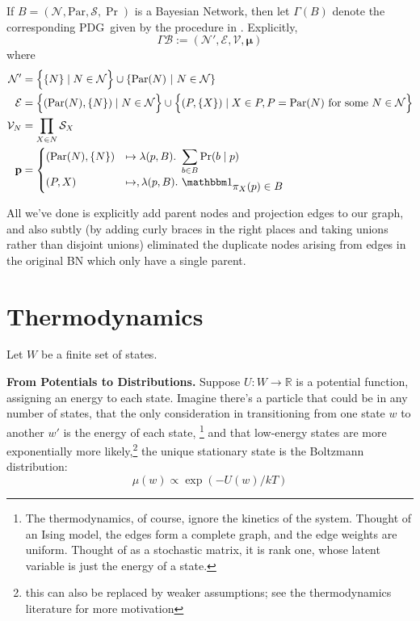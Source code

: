 \documentclass{article}
\newcommand{\bmu}{\boldsymbol{\mu}}
\newcommand{\Ed}{\mathcal E}
\newcommand{\MN}{PDG}
\numberwithin{equation}{section}
\begin{document}
	
	\begin{defn} \label{def:bnconvert-formal}
		If $B = (\mathcal N, \mathrm{Par}, \mathcal S, \Pr)$ is a Bayesian Network, then let $\Gamma (B)$ denote the corresponding \MN\ given by the procedure in . Explicitly, 
		\[ \Gamma\mathcal B :=  (\mathcal N', \Ed, \mathcal V, \bmu) \]
		where %
		\begin{align*}
		\mathcal N' &=  \left\{ \Big.\{N\} \mid N \in \mathcal N\right\} \cup \left\{ \mathrm{Par}(N) ~\middle|~ N \in \cal N \right\} \\%
		\Ed &= \left\{ \vphantom{\Big|}(\mathrm{Par}(N), \{N\}) \mid N \in \mathcal N \right\} \cup 
		\left\{\vphantom{\Big|} (P, \{X\}) \mid X \in P, P = \mathrm{Par}(N) \text{ for some }N \in \mathcal N \right\} \\
		\mathcal V_N &= \prod_{X \in N} \mathcal S_X \\
		\mathbf p &= \begin{cases}
		(\mathrm{Par}(N), \{N\}) &\mapsto \lambda(p, B).~ \displaystyle\sum_{b \in  B} \Pr(b \mid p) \\
		(P, X) &\mapsto, \lambda (p, B).~ \displaystyle \mathbbm 1_{\displaystyle\pi_X(p) \in B}
		\end{cases}
		\end{align*}
	\end{defn}
	All we've done is explicitly add parent nodes and projection edges to our graph, and also subtly (by adding curly braces in the right places and taking unions rather than disjoint unions) eliminated the duplicate nodes arising from edges in the original BN which only have a single parent.
	
	\section{Thermodynamics}\label{sec:thermo-background}
	Let $W$ be a finite set of states.
	
	\textbf{From Potentials to Distributions.}
	Suppose $U: W \to \mathbb R$ is a potential function, assigning an energy to each state. Imagine there's a particle that could be in any number of states, that the only consideration in transitioning from one state $w$ to another $w'$ is the energy of each state,%
		\footnote{The thermodynamics, of course, ignore the kinetics of the system. Thought of an Ising model, the edges form a complete graph, and the edge weights are uniform. Thought of as a stochastic matrix, it is rank one, whose latent variable is just the energy of a state.}
	and that low-energy states are more exponentially more likely,\footnote{this can also be replaced by weaker assumptions; see the thermodynamics literature for more motivation}
	the unique stationary state is the Boltzmann distribution:
	\begin{equation}
		 \mu(w) \propto \exp( - U(w) / kT ) \label{eq:boltzmann-appendix}
	\end{equation}
\end{document}
